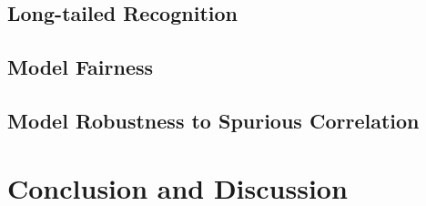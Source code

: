 \documentclass[10pt,twocolumn,letterpaper]{article}
\begin{document}
\subsection{Long-tailed Recognition}\label{sec:lt}


\subsection{Model Fairness}\label{sec:fairness}


\subsection{Model Robustness to Spurious Correlation}\label{sec:robustness}

\section{Conclusion and Discussion}\label{sec:conclusion}



{\small


}
\end{document}
